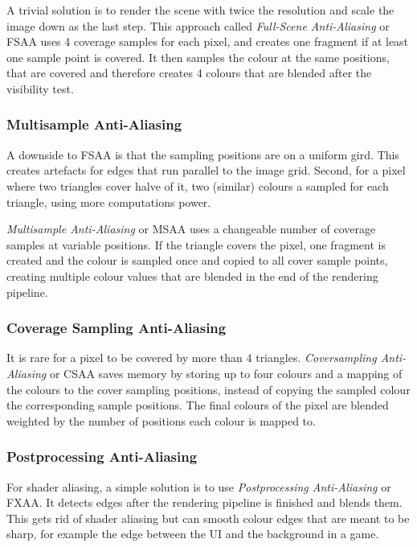 \documentclass[english]{panikzettel}
\begin{document}
A trivial solution is to render the scene with twice the resolution and scale the image down as the last step. This approach called \emph{Full-Scene Anti-Aliasing} or FSAA uses 4 coverage samples for each pixel, and creates one fragment if at least one sample point is covered.
It then samples the colour at the same positions, that are covered and therefore creates 4 colours that are blended after the visibility test.

\subsubsection*{Multisample Anti-Aliasing}

A downside to FSAA is that the sampling positions are on a uniform gird. This creates artefacts for edges that run parallel to the image grid.
Second, for a pixel where two triangles cover halve of it, two (similar) colours a sampled for each triangle, using more computations power.

\emph{Multisample Anti-Aliasing} or MSAA uses a changeable number of coverage samples at variable positions. If the triangle covers the pixel, one fragment is created and the colour is sampled once and copied to all cover sample points, creating multiple colour values that are blended in the end of the rendering pipeline.

\subsubsection*{Coverage Sampling Anti-Aliasing}

It is rare for a pixel to be covered by more than 4 triangles. \emph{Coversampling Anti-Aliasing} or CSAA saves memory by storing up to four colours and a mapping of the colours to the cover sampling positions, instead of copying the sampled colour the corresponding sample positions. The final colours of the pixel are blended weighted by the number of positions each colour is mapped to.

\subsubsection*{Postprocessing Anti-Aliasing}

For shader aliasing, a simple solution is to use \emph{Postprocessing Anti-Aliasing} or FXAA. It detects edges after the rendering pipeline is finished and blends them. This gets rid of shader aliasing but can smooth colour edges that are meant to be sharp, for example the edge between the UI and the background in a game.
\end{document}

